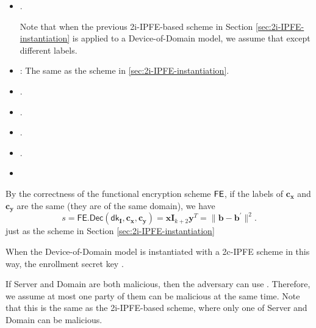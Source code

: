 \begin{itemize}

	\item .

	Note that when the previous 2i-IPFE-based scheme in Section \ref{sec:2i-IPFE-instantiation} is applied to a Device-of-Domain model, we assume that  except different labels.

	\item : The same as the scheme in \ref{sec:2i-IPFE-instantiation}. 

	\item .

	\item .

	\item .

	\item .

	\item 

\end{itemize}

By the correctness of the functional encryption scheme $\sf FE$, if the labels of $\mathbf{c_x}$ and $\mathbf{c_y}$ are the same (they are of the same domain), we have
\[
	s = \mathsf{FE.Dec}(\mathsf{dk}_{\mathbf{I}}, \mathbf{c_x}, \mathbf{c_y}) =  \mathbf{x} \mathbf{I}_{k+2} \mathbf{y}^T = \| \mathbf{b} - \mathbf{b}^\prime \|^2.
\]
just as the scheme in Section \ref{sec:2i-IPFE-instantiation}

When the Device-of-Domain model is instantiated with a 2c-IPFE scheme in this way, the enrollment secret key .

If \textsf{Server} and \textsf{Domain} are both malicious, then the adversary can use . Therefore, we assume at most one party of them can be malicious at the same time. Note that this is the same as the 2i-IPFE-based scheme, where only one of \textsf{Server} and \textsf{Domain} can be malicious.

\fi


